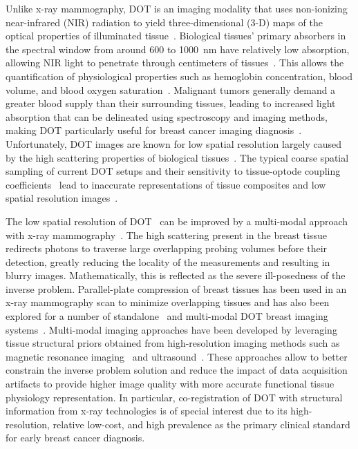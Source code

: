 Unlike x-ray mammography, DOT is an imaging modality that uses non-ionizing near-infrared (NIR) radiation to yield three-dimensional (3-D) maps of the optical properties of illuminated tissue~\cite{Boas2001, Dehghani2009, Yamada2014, Hoshi2016}. Biological tissues' primary absorbers in the spectral window from around 600 to 1000~nm have relatively low absorption, allowing NIR light to penetrate through centimeters of tissues~\cite{Gibson2005}. This allows the quantification of physiological properties such as hemoglobin concentration, blood volume, and blood oxygen saturation~\cite{Leff2008, Boas2001}. Malignant tumors generally demand a greater blood supply than their surrounding tissues, leading to increased light absorption that can be delineated using spectroscopy and imaging methods, making DOT particularly useful for breast cancer imaging diagnosis~\cite{Wang2022, Vavadi2014, Flexman2013, Choe2009, Taroni2005}. Unfortunately, DOT images are known for low spatial resolution largely caused by the high scattering properties of biological tissues~\cite{Boas2001}. The typical coarse spatial sampling of current DOT setups and their sensitivity to tissue-optode coupling coefficients~\cite{Schweiger2007} lead to inaccurate representations of tissue composites and low spatial resolution images~\cite{Durduran2010}.

The low spatial resolution of DOT~\cite{Li2010} can be improved by a multi-modal approach with x-ray mammography~\cite{Zimmermann2017, Deng2015, Deng2015a, Fang2009a}. The high scattering present in the breast tissue redirects photons to traverse large overlapping probing volumes before their detection, greatly reducing the locality of the measurements and resulting in blurry images. Mathematically, this is reflected as the severe ill-posedness of the inverse problem. Parallel-plate compression of breast tissues has been used in an x-ray mammography scan to minimize overlapping tissues and has also been explored for a number of standalone~\cite{Choe2009, Culver2003} and multi-modal DOT breast imaging systems~\cite{ZhuReview2020, Fang2009a, Krishnaswamy2012}. Multi-modal imaging approaches have been developed by leveraging tissue structural priors obtained from high-resolution imaging methods such as magnetic resonance imaging~\cite{Ghussein2013,Ntziachristos2002} and ultrasound~\cite{Zhu2010}. These approaches allow to better constrain the inverse problem solution and reduce the impact of data acquisition artifacts to provide higher image quality with more accurate functional tissue physiology representation. In particular, co-registration of DOT with structural information from x-ray technologies is of special interest due to its high-resolution, relative low-cost, and high prevalence as the primary clinical standard for early breast cancer diagnosis.

